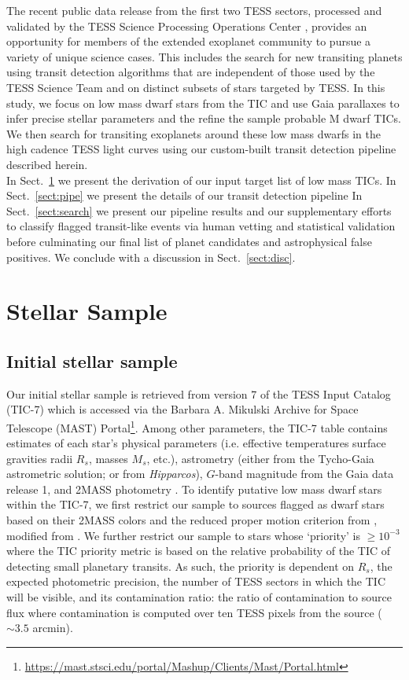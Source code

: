 The recent public data release from the first two TESS sectors, processed and validated by the
TESS Science Processing Operations Center \citep{jenkins16,twicken18,li18}, provides an opportunity
for members of the extended exoplanet community to pursue a variety of unique science cases. This
includes the search for new transiting planets using transit detection algorithms that are independent
of those used by the TESS Science Team and on distinct subsets of stars targeted by TESS.
In this study, we focus on low mass dwarf stars from the TIC and use Gaia parallaxes to infer precise
stellar parameters and the refine the sample probable M dwarf TICs. We then search for transiting
exoplanets around these low mass dwarfs in the high cadence TESS light curves using our
custom-built transit detection pipeline described herein. \\

In Sect.~\ref{sect:stars} we present the derivation of our input target list of low mass TICs.
In Sect.~\ref{sect:pipe} we present the details of our transit detection pipeline  In
Sect.~\ref{sect:search} we present our pipeline results and our supplementary efforts to
classify flagged transit-like events via human vetting and statistical validation before
culminating our final list of planet candidates and astrophysical false positives.
We conclude with a discussion in Sect.~\ref{sect:disc}.


\section{Stellar Sample} \label{sect:stars}
\subsection{Initial stellar sample}
Our initial stellar sample is retrieved from version 7 of the TESS Input Catalog (TIC-7) which
is accessed via the Barbara A. Mikulski Archive for Space Telescope (MAST)
Portal\footnote{\url{https://mast.stsci.edu/portal/Mashup/Clients/Mast/Portal.html}}. Among other
parameters, the TIC-7 table contains estimates of each star's physical parameters (i.e. effective
temperatures \teff{,} surface gravities \logg{,} radii $R_s$, masses $M_s$, etc.),
astrometry (either from the Tycho-Gaia astrometric solution; \citealt{gaia16,brown16}
or from \emph{Hipparcos}), $G$-band magnitude from the Gaia data release 1, and 2MASS photometry
\citep{cutri03}. To identify putative low mass dwarf stars within the TIC-7, we first restrict our sample to
sources flagged as dwarf stars based on their 2MASS colors and the reduced proper motion criterion
from \cite{stassun17}, modified from \cite{collier07}. We further restrict our sample to stars whose
`priority' is $\geq 10^{-3}$ where the TIC priority metric is based on the relative probability of the TIC
of detecting small planetary transits. As such, the priority is dependent on $R_s$, the
expected photometric precision, the number of TESS sectors in which the TIC will be visible, and its
contamination ratio: the ratio of contamination to source flux where contamination is computed over ten
TESS pixels from the source ($\sim 3.5$ arcmin). \\

